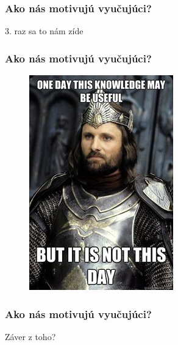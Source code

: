\documentclass{beamer}
\begin{document}
\begin{frame}
\frametitle{Ako nás motivujú vyučujúci?}
\begin{center}
{\Large 3. raz sa to nám zíde}
\end{center}
\end{frame}

\begin{frame}
\frametitle{Ako nás motivujú vyučujúci?}
\begin{figure}
\includegraphics[height=0.8\textheight]{images/may_be_useful.jpg}
\end{figure}
\end{frame}


\begin{frame}
\frametitle{Ako nás motivujú vyučujúci?}
\begin{center}
{\Large Záver z toho?}
\end{center}
\end{frame}
\end{document}
